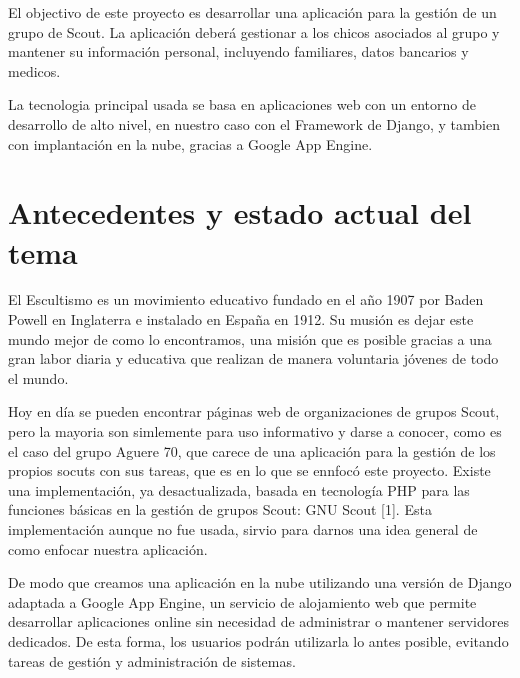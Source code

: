 El objectivo de este proyecto es desarrollar una aplicación para la gestión de un grupo
de Scout. La aplicación deberá gestionar a los chicos asociados al grupo y mantener su 
información personal, incluyendo familiares, datos bancarios y medicos. 

La tecnologia principal usada se basa en aplicaciones web con un entorno de desarrollo de alto
nivel, en nuestro caso con el Framework de Django, y tambien con implantación en la nube, gracias a 
Google App Engine.
\section{Antecedentes y estado actual del tema}
\label{1:sec:1}
El Escultismo es un movimiento educativo fundado en el año 1907 por Baden Powell en Inglaterra
e instalado en España en 1912. Su musión es dejar este mundo mejor de como lo encontramos,
una misión que es posible gracias a una gran labor diaria y educativa que realizan de manera
voluntaria jóvenes de todo el mundo.

Hoy en día se pueden encontrar páginas web de organizaciones de grupos Scout,  pero la mayoria
son simlemente para uso informativo y darse a conocer, como es el caso del grupo Aguere 70, que carece de
una aplicación para la gestión de los propios socuts con sus tareas, que es en lo que se ennfocó este proyecto. Existe
una implementación, ya desactualizada, basada en tecnología PHP para las funciones básicas en la gestión de grupos
Scout: GNU Scout [1]. Esta implementación aunque no fue usada, sirvio para darnos una idea general
de como enfocar nuestra aplicación.

De modo que creamos una aplicación en la nube utilizando una versión de Django adaptada a Google 
App Engine, un servicio de alojamiento web que permite desarrollar aplicaciones online sin 
necesidad de administrar o mantener servidores dedicados. De esta forma, los usuarios podrán utilizarla lo antes posible, evitando 
tareas de gestión y administración de sistemas.


